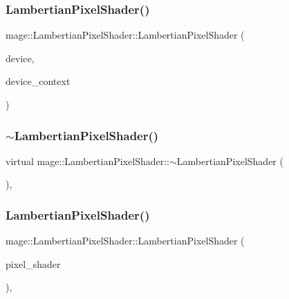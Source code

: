 \subsubsection{\texorpdfstring{Lambertian\+Pixel\+Shader()}{LambertianPixelShader()}\hspace{0.1cm}{\footnotesize\ttfamily [1/3]}}
{\footnotesize\ttfamily mage\+::\+Lambertian\+Pixel\+Shader\+::\+Lambertian\+Pixel\+Shader (\begin{DoxyParamCaption}\item[{I\+D3\+D11\+Device2 $\ast$}]{device,  }\item[{I\+D3\+D11\+Device\+Context2 $\ast$}]{device\+\_\+context }\end{DoxyParamCaption})}

\hypertarget{classmage_1_1_lambertian_pixel_shader_aedea7342ae95c6532a086fb28978b5b0}{}\label{classmage_1_1_lambertian_pixel_shader_aedea7342ae95c6532a086fb28978b5b0} 
\subsubsection{\texorpdfstring{$\sim$\+Lambertian\+Pixel\+Shader()}{~LambertianPixelShader()}}
{\footnotesize\ttfamily virtual mage\+::\+Lambertian\+Pixel\+Shader\+::$\sim$\+Lambertian\+Pixel\+Shader (\begin{DoxyParamCaption}{ }\end{DoxyParamCaption})\hspace{0.3cm}{\ttfamily [virtual]}, {\ttfamily [default]}}

\hypertarget{classmage_1_1_lambertian_pixel_shader_a0e7a36645bb7e1fa9bd481575886ddad}{}\label{classmage_1_1_lambertian_pixel_shader_a0e7a36645bb7e1fa9bd481575886ddad} 
\subsubsection{\texorpdfstring{Lambertian\+Pixel\+Shader()}{LambertianPixelShader()}\hspace{0.1cm}{\footnotesize\ttfamily [2/3]}}
{\footnotesize\ttfamily mage\+::\+Lambertian\+Pixel\+Shader\+::\+Lambertian\+Pixel\+Shader (\begin{DoxyParamCaption}\item[{const \hyperlink{classmage_1_1_lambertian_pixel_shader}{Lambertian\+Pixel\+Shader} \&}]{pixel\+\_\+shader }\end{DoxyParamCaption})\hspace{0.3cm}{\ttfamily [private]}, {\ttfamily [delete]}}

